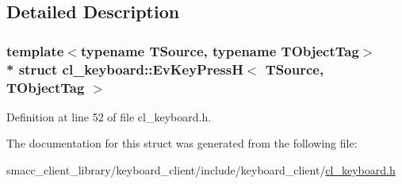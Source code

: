 \subsection{Detailed Description}
\subsubsection*{template$<$typename T\+Source, typename T\+Object\+Tag$>$\\*
struct cl\+\_\+keyboard\+::\+Ev\+Key\+Press\+H$<$ T\+Source, T\+Object\+Tag $>$}



Definition at line 52 of file cl\+\_\+keyboard.\+h.



The documentation for this struct was generated from the following file\+:\begin{DoxyCompactItemize}
\item 
smacc\+\_\+client\+\_\+library/keyboard\+\_\+client/include/keyboard\+\_\+client/\hyperlink{cl__keyboard_8h}{cl\+\_\+keyboard.\+h}\end{DoxyCompactItemize}
